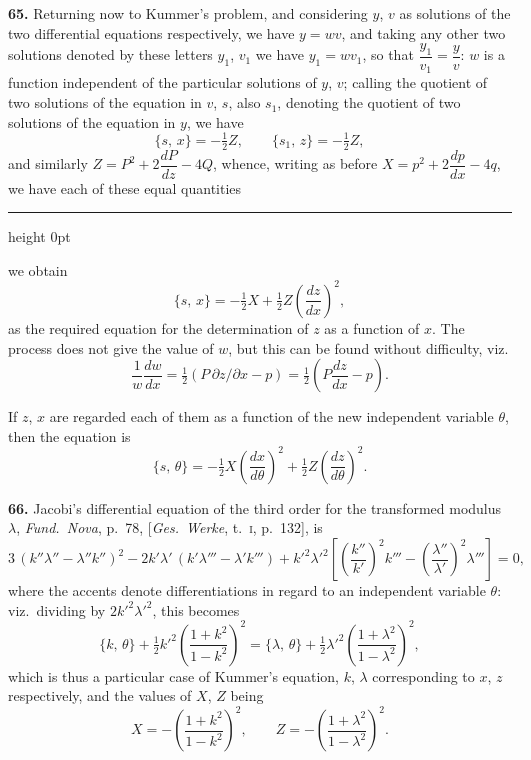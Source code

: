 \documentclass[11pt,a4paper]{article}
\newcommand{\artno}[1]{\textbf{#1.}\quad}
\begin{document}
\artno{65} Returning now to Kummer's problem, and considering $y$, $v$ as
solutions of the two differential equations respectively, we have $y = wv$,
and taking any other two solutions denoted by these letters $y_1$, $v_1$ we
have $y_1 = wv_1$, so that $\dfrac{y_1}{v_1} = \dfrac{y}{v}$: $w$ is a
function independent of the particular solutions of $y$, $v$; calling the
quotient of two solutions of the equation in $v$, $s$, also $s_1$, denoting
the quotient of two solutions of the equation in $y$, we have
\[
  \{s,\,x\} = -\tfrac{1}{2}Z, \qquad \{s_1,\,z\} = -\tfrac{1}{2}Z,
\]
and similarly $Z = P^2 + 2\dfrac{dP}{dz} - 4Q$, whence, writing as before
$X = p^2 + 2\dfrac{dp}{dx} - 4q$, we have each of these equal quantities

\bigskip
\hrule height 0pt
\bigskip

we obtain
\[
  \{s,\,x\} = -\tfrac{1}{2}X + \tfrac{1}{2}Z\!\left(\frac{dz}{dx}\right)^{\!2},
\]
as the required equation for the determination of $z$ as a function of $x$.
The process does not give the value of $w$, but this can be found without
difficulty, viz.
\[
  \frac{1}{w}\frac{dw}{dx} = \tfrac{1}{2}(P\,\partial z/\partial x - p)
                              = \tfrac{1}{2}\!\left(P\frac{dz}{dx} - p\right).
\]

If $z$, $x$ are regarded each of them as a function of the new independent
variable $\theta$, then the equation is
\[
  \{s,\,\theta\} = -\tfrac{1}{2}X\!\left(\frac{dx}{d\theta}\right)^{\!2}
                   + \tfrac{1}{2}Z\!\left(\frac{dz}{d\theta}\right)^{\!2}.
\]

\artno{66} Jacobi's differential equation of the third order for the
transformed modulus $\lambda$, \emph{Fund.\ Nova}, p.~78, [\emph{Ges.\ Werke},
t.\ \textsc{i}, p.~132], is
\[
  3\,(k''\lambda'' - \lambda''k'')^{2}
   - 2k'\lambda'\,(k'\lambda''' - \lambda'k''')
   + k'^{2}\lambda'^{2}\!\left[\!\left(\frac{k''}{k'}\right)^{\!2} k'''
       -\!\left(\frac{\lambda''}{\lambda'}\right)^{\!2}\lambda''' \right] = 0,
\]
where the accents denote differentiations in regard to an independent
variable $\theta$: viz.\ dividing by $2k'^{2}\lambda'^{2}$, this becomes
\[
  \{k,\,\theta\} + \tfrac{1}{2}k'^{2}\!\left(\frac{1+k^{2}}{1-k^{2}}\right)^{\!2}
   = \{\lambda,\,\theta\}
   + \tfrac{1}{2}\lambda'^{2}\!\left(\frac{1+\lambda^{2}}{1-\lambda^{2}}\right)^{\!2},
\]
which is thus a particular case of Kummer's equation, $k$, $\lambda$
corresponding to $x$, $z$ respectively, and the values of $X$, $Z$ being
\[
  X = -\!\left(\frac{1+k^{2}}{1-k^{2}}\right)^{\!2},\qquad
  Z = -\!\left(\frac{1+\lambda^{2}}{1-\lambda^{2}}\right)^{\!2}.
\]
\end{document}
